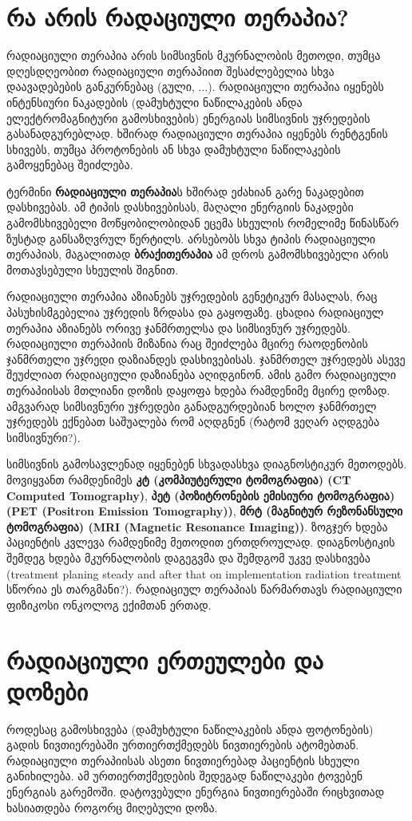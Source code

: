 \documentclass[12pt,a4paper,]{report}
\begin{document}
\section{რა არის რადაციული თერაპია?}
რადიაციული თერაპია არის სიმსივნის მკურნალობის მეთოდი, თუმცა დღესდღეობით რადიაციული თერაპიით შესაძლებელია სხვა დაავადებების განკურნებაც (გული, ...). რადიაციული თერაპია იყენებს ინტენსიური ნაკადების (დამუხტული ნაწილაკების ანდა ელექტრომაგნიტური გამოსხივების) ენერგიას სიმსივნის უჯრედების გასანადგურებლად. ხშირად რადიაციული თერაპია იყენებს რენტგენის სხივებს, თუმცა პროტონების ან სხვა დამუხტული ნაწილაკების გამოყენებაც შეიძლება.

ტერმინი \textbf{რადიაციული თერაპია}ს ხშირად ეძახიან  გარე ნაკადებით დასხივებას. ამ ტიპის დასხივებისას, მაღალი ენერგიის ნაკადები გამომსხივებელი მოწყობილობიდან ეცემა სხეულის რომელიმე წინასწარ ზუსტად განსაზღვრულ წერტილს. არსებობს სხვა ტიპის რადიაციული თერაპიას, მაგალითად \textbf{ბრაქითერაპია} ამ დროს გამომსხივებელი არის მოთავსებული სხეულის შიგნით. 

რადიაციული თერაპია აზიანებს უჯრედების გენეტიკურ მასალას, რაც პასუხისმგებელია უჯრედის ზრდასა და გაყოფაზე. ცხადია რადიაციულ თერაპია აზიანებს ორივე ჯანმრთელსა და სიმსივნურ უჯრედებს. რადიაციული თერაპიის მიზანია რაც შეიძლება მცირე რაოდენობის ჯანმრთელი უჯრედი დაზიანდეს დასხივებისას. ჯანმრთელ უჯრედებს ასევე შეუძლიათ რადიაციული დაზიანება აღიდგინონ. ამის გამო რადიაციული თერაპიისას მთლიანი დოზის დაყოფა ხდება რამდენიმე მცირე დოზად. ამგვარად სიმსივნური უჯრედები განადგურდებიან ხოლო ჯანმრთელ უჯრედებს ექნებათ საშუალება რომ აღდგნენ (რატომ ვეღარ აღდგება სიმსივნური?). 

სიმსივნის გამოსავლენად იყენებენ სხვადასხვა დიაგნოსტიკურ მეთოდებს. მოვიყვანთ რამდენიმეს \textbf{კტ (კომპიუტერული ტომოგრაფია) (CT Computed Tomography)}, \textbf{პეტ (პოზიტრონების ემისიური ტომოგრაფია) (PET (Positron Emission Tomography))}, \textbf{მრტ (მაგნიტურ რეზონანსული ტომოგრაფია) (MRI (Magnetic Resonance Imaging))}. ზოგჯერ ხდება პაციენტის კვლევა რამდენიმე მეთოდით ერთდროულად. დიაგნოსტიკის შემდეგ ხდება მკურნალობის დაგეგვმა და შემდგომ უკვე დასხივება (treatment planing steady and after that on implementation radiation treatment სწორია ეს თარგმანი?). რადიაციულ თერაპიას წარმართავს რადიაციული ფიზიკოსი ონკოლოგ ექიმთან ერთად. 

\section{რადიაციული ერთეულები და დოზები}
როდესაც გამოსხივება (დამუხტული ნაწილაკების ანდა ფოტონების) გადის ნივთიერებაში ურთიერთქმედებს ნივთიერების ატომებთან. რადიაციული თერაპიისას ასეთი ნივთიერებად პაციენტის სხეული განიხილება. ამ ურთიერთქმედების შედეგად ნაწილაკები ტოვებენ ენერგიას გარემოში. დატოვებული ენერგია ნივთიერებაში რიცხვითად ხასიათდება როგორც მიღებული დოზა. 
\end{document}
